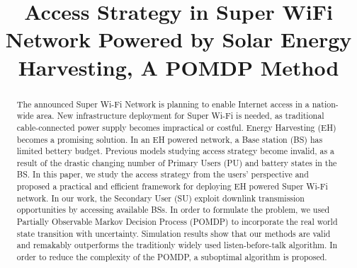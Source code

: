 \documentclass[conference]{IEEEtran}
\begin{document}
\title{Access Strategy in Super WiFi Network Powered by Solar Energy Harvesting, A POMDP Method}

\author{
	\small{}}
\maketitle

\begin{abstract}
The announced Super Wi-Fi Network is planning to enable Internet access in a nation-wide area.
New infrastructure deployment for Super Wi-Fi is needed, 
as traditional cable-connected power supply becomes impractical or costful.
Energy Harvesting (EH) becomes a promising solution.
In an EH powered network, a Base station (BS) has limited bettery budget.
Previous models studying access strategy become invalid,
as a result of the drastic changing number of Primary Users (PU) and battery states in the BS.
In this paper, we study the access strategy from the users' perspective
and proposed a practical and efficient framework for deploying EH powered Super Wi-Fi network.
In our work, the Secondary User (SU) exploit downlink transmission opportunities by accessing available BSs.
In order to formulate the problem, 
we used Partially Observable Markov Decision Process (POMDP) to incorporate the
real world state transition with uncertainty.
Simulation results show that our methods are valid and remakably outperforms 
the traditionly widely used listen-before-talk algorithm.
In order to reduce the complexity of the POMDP,
a suboptimal algorithm is proposed.
\end{abstract}
\IEEEpeerreviewmaketitle
\end{document}
